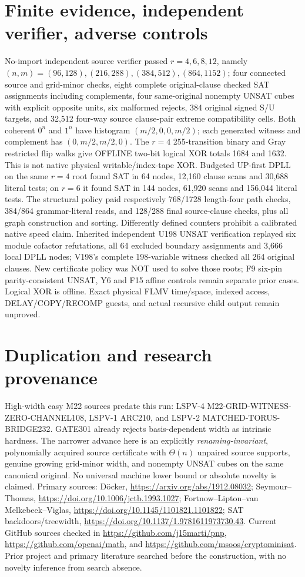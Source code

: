 \documentclass[11pt]{article}
\begin{document}
\section*{Finite evidence, independent verifier, adverse controls}
No-import independent source verifier passed $r=4,6,8,12$, namely $(n,m)=(96,128),(216,288),(384,512),(864,1152)$; four connected source and grid-minor checks, eight complete original-clause checked SAT assignments including complements, four same-original nonempty UNSAT cubes with explicit opposite units, six malformed rejects, 384 original signed S/U targets, and 32,512 four-way source clause-pair extreme compatibility cells. Both coherent $0^n$ and $1^n$ have histogram $(m/2,0,0,m/2)$; each generated witness and complement has $(0,m/2,m/2,0)$. The $r=4$ 255-transition binary and Gray restricted flip walks give OFFLINE two-bit logical XOR totals 1684 and 1632. This is not native physical writable/index-tape XOR.
Budgeted UP-first DPLL on the same $r=4$ root found SAT in 64 nodes, 12,160 clause scans and 30,688 literal tests; on $r=6$ it found SAT in 144 nodes, 61,920 scans and 156,044 literal tests. The structural policy paid respectively 768/1728 length-four path checks, 384/864 grammar-literal reads, and 128/288 final source-clause checks, plus all graph construction and sorting. Differently defined counters prohibit a calibrated native speed claim.
Inherited independent U198 UNSAT verification replayed six module cofactor refutations, all 64 excluded boundary assignments and 3,666 local DPLL nodes; V198's complete 198-variable witness checked all 264 original clauses. New certificate policy was NOT used to solve those roots; F9 six-pin parity-consistent UNSAT, Y6 and F15 affine controls remain separate prior cases. Logical XOR is offline. Exact physical FLMV time/space, indexed access, DELAY/COPY/RECOMP guests, and actual recursive child output remain unproved.
\section*{Duplication and research provenance}
High-width easy M22 sources predate this run: LSPV-4 M22-GRID-WITNESS-ZERO-CHANNEL108, LSPV-1 ARC210, and LSPV-2 MATCHED-TORUS-BRIDGE232. GATE301 already rejects basis-dependent width as intrinsic hardness. The narrower advance here is an explicitly \emph{renaming-invariant}, polynomially acquired source certificate with $\Theta(n)$ unpaired source supports, genuine growing grid-minor width, and nonempty UNSAT cubes on the same canonical original. No universal machine lower bound or absolute novelty is claimed.
Primary sources: D\"ocker, \url{https://arxiv.org/abs/1912.08032}; Seymour--Thomas, \url{https://doi.org/10.1006/jctb.1993.1027}; Fortnow--Lipton--van Melkebeek--Viglas, \url{https://doi.org/10.1145/1101821.1101822}; SAT backdoors/treewidth, \url{https://doi.org/10.1137/1.9781611973730.43}. Current GitHub sources checked in \url{https://github.com/j15marti/pnp}, \url{https://github.com/openai/math}, and \url{https://github.com/msoos/cryptominisat}. Prior project and primary literature searched before the construction, with no novelty inference from search absence.
\end{document}
